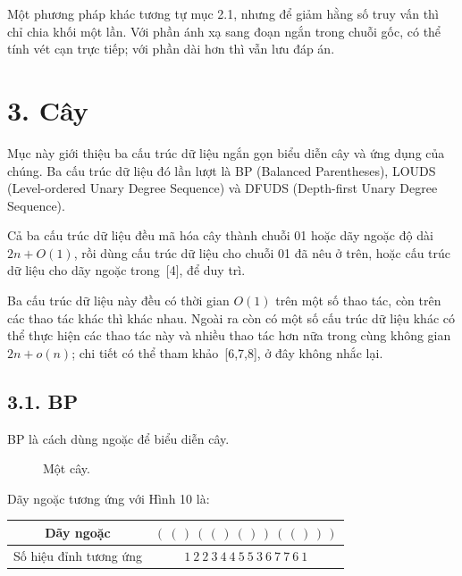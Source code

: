 \documentclass[11pt]{article}
\begin{document}
Một phương pháp khác tương tự mục 2.1, nhưng để giảm hằng số truy vấn thì chỉ
chia khối một lần. Với phần ánh xạ sang đoạn ngắn trong chuỗi gốc, có thể tính
vét cạn trực tiếp; với phần dài hơn thì vẫn lưu đáp án.

\section*{3. Cây}

Mục này giới thiệu ba cấu trúc dữ liệu ngắn gọn biểu diễn cây và ứng dụng của
chúng. Ba cấu trúc dữ liệu đó lần lượt là BP (Balanced Parentheses), LOUDS
(Level-ordered Unary Degree Sequence) và DFUDS (Depth-first Unary Degree
Sequence).

Cả ba cấu trúc dữ liệu đều mã hóa cây thành chuỗi 01 hoặc dãy ngoặc độ dài
\(2n+O(1)\), rồi dùng cấu trúc dữ liệu cho chuỗi 01 đã nêu ở trên, hoặc cấu
trúc dữ liệu cho dãy ngoặc trong~[4], để duy trì.

Ba cấu trúc dữ liệu này đều có thời gian \(O(1)\) trên một số thao tác, còn
trên các thao tác khác thì khác nhau. Ngoài ra còn có một số cấu trúc dữ liệu
khác có thể thực hiện các thao tác này và nhiều thao tác hơn nữa trong cùng
không gian \(2n+o(n)\); chi tiết có thể tham khảo~[6,7,8], ở đây không nhắc
lại.

\subsection*{3.1. BP}

BP là cách dùng ngoặc để biểu diễn cây.

\setcounter{figure}{9}
\begin{figure}[ht]
\centering
{}
\caption{Một cây.}
\end{figure}

Dãy ngoặc tương ứng với Hình 10 là:

\begin{center}
\begin{tabular}{c|c}
Dãy ngoặc & \((\ (\,)\ (\,(\,)\ (\,)\,)\ (\,(\,)\,)\,)\)\\
\hline
Số hiệu đỉnh tương ứng & \(1\ 2\ 2\ 3\ 4\ 4\ 5\ 5\ 3\ 6\ 7\ 7\ 6\ 1\)
\end{tabular}
\end{center}
\end{document}
